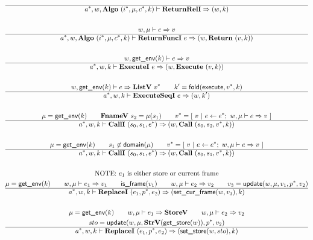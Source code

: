 \begin{gather*}
\newline \\
  \\
  \hline
  \seq{a}, w, \algo~ (\seq{i}, \mu, \seq c, k) \vdash \returnreli \Rightarrow (w, k) \\
%
\newline \\
  w, \mu \vdash e \Rightarrow v \\
  \hline
  \seq{a}, w, \algo ~ (\seq{i}, \mu, \seq c, k) \vdash \returnfunci ~ e \Rightarrow (w, \ret ~ (v, k)) \\
%
\newline \\
  w, \getenv(k) \vdash e \Rightarrow v \\
  \hline
  \seq{a}, w, k \vdash \executei ~ e \Rightarrow (w, \exe ~ (v, k)) \\
%
\newline \\
  w, \getenv(k) \vdash e \Rightarrow \listv ~ \seq v \qquad
  k' = \fold(\execute, \seq v, k) \\
  \hline
  \seq{a}, w, k \vdash \executeseqi ~ e \Rightarrow (w, k') \\
%
\newline \\
  \mu = \getenv(k) \qquad
  \fnamev ~ s_2 = \mu(s_1) \qquad
  \seq{v} = [ ~ v ~ | ~ e \leftarrow \seq{e}; ~ w, \mu \vdash e \Rightarrow v ~ ] \\
  \hline
  \seq{a}, w, k \vdash \calli ~ (s_0, s_1, \seq e) \Rightarrow (w, \call ~ (s_0, s_2, \seq v, k)) \\
%
\newline \\
  \mu = \getenv(k) \qquad
  s_1 \not\in \domain(\mu) \qquad
  \seq{v} = [ ~ v ~ | ~ e \leftarrow \seq{e}; ~ w, \mu \vdash e \Rightarrow v ~ ] \\
  \hline
  \seq{a}, w, k \vdash \calli ~ (s_0, s_1, \seq e) \Rightarrow (w, \call ~ (s_0, s_1, \seq v, k)) \\
%
\newline \\
\text{NOTE: $e_1$ is either store or current frame} \\
  \mu = \getenv(k) \qquad
  w, \mu \vdash e_1 \Rightarrow v_1 \qquad
  \isframe(v_1) \qquad
  w, \mu \vdash e_2 \Rightarrow v_2 \qquad
  v_3 = \update(w, \mu, v_1, \seq p, v_2) \\
  \hline
  \seq{a}, w, k \vdash \replacei ~ (e_1, \seq{p}, e_2) \Rightarrow (\setcurframe(w, v_3), k) \\
%
\newline \\
  \mu = \getenv(k) \qquad
  w, \mu \vdash e_1 \Rightarrow \storev \qquad
  w, \mu \vdash e_2 \Rightarrow v_2 \\
  sto = \update(w, \mu, \strv (\getstore(w)), \seq p, v_2) \\
  \hline
  \seq{a}, w, k \vdash \replacei ~ (e_1, \seq{p}, e_2)
  \Rightarrow (\setstore(w, sto), k) \\
\end{gather*}

